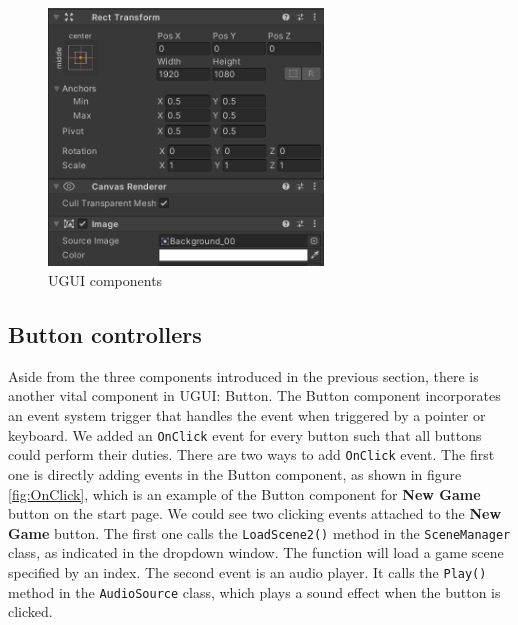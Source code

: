 \documentclass[msc,deptreport,ai]{infthesis}      %
\begin{document}
\begin{figure}
    \centering
    \includegraphics[width=0.65\textwidth]{UGUI.png}
    \caption{UGUI components}
    \label{fig:UGUI}
\end{figure}

\subsection{Button controllers}

Aside from the three components introduced in the previous section, there is another vital component in UGUI: Button. The Button component incorporates an event system trigger that handles the event when triggered by a pointer or keyboard. We added an \texttt{OnClick} event for every button such that all buttons could perform their duties. There are two ways to add \texttt{OnClick} event. The first one is directly adding events in the Button component, as shown in figure \ref{fig:OnClick}, which is an example of the Button component for \textbf{New Game} button on the start page. We could see two clicking events attached to the \textbf{New Game} button. The first one calls the \texttt{LoadScene2()} method in the \texttt{SceneManager} class, as indicated in the dropdown window. The function will load a game scene specified by an index. The second event is an audio player. It calls the \texttt{Play()} method in the \texttt{AudioSource} class, which plays a sound effect when the button is clicked.
\end{document}
